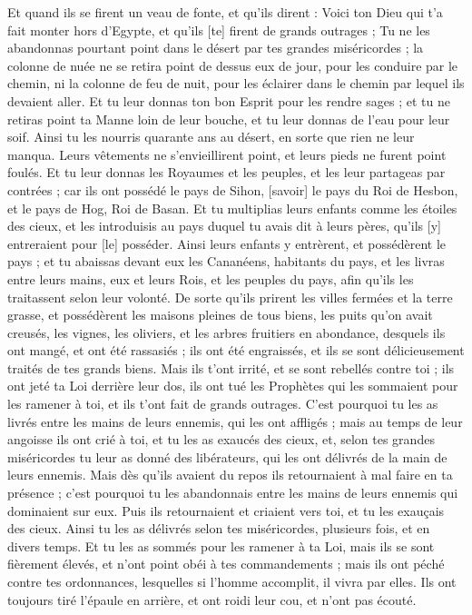 \begin{multicols}{2}
Et quand ils se firent un veau de fonte, et qu'ils dirent : Voici ton Dieu qui t'a fait monter hors d'Egypte, et qu'ils [te] firent de grands outrages ;
Tu ne les abandonnas pourtant point dans le désert par tes grandes miséricordes ; la colonne de nuée ne se retira point de dessus eux de jour, pour les conduire par le chemin, ni la colonne de feu de nuit, pour les éclairer dans le chemin par lequel ils devaient aller.
Et tu leur donnas ton bon Esprit pour les rendre sages ; et tu ne retiras point ta Manne loin de leur bouche, et tu leur donnas de l'eau pour leur soif.
Ainsi tu les nourris quarante ans au désert, en sorte que rien ne leur manqua. Leurs vêtements ne s'envieillirent point, et leurs pieds ne furent point foulés.
Et tu leur donnas les Royaumes et les peuples, et les leur partageas par contrées ; car ils ont possédé le pays de Sihon, [savoir] le pays du Roi de Hesbon, et le pays de Hog, Roi de Basan.
Et tu multiplias leurs enfants comme les étoiles des cieux, et les introduisis au pays duquel tu avais dit à leurs pères, qu'ils [y] entreraient pour [le] posséder.
Ainsi leurs enfants y entrèrent, et possédèrent le pays ; et tu abaissas devant eux les Cananéens, habitants du pays, et les livras entre leurs mains, eux et leurs Rois, et les peuples du pays, afin qu'ils les traitassent selon leur volonté.
De sorte qu'ils prirent les villes fermées et la terre grasse, et possédèrent les maisons pleines de tous biens, les puits qu'on avait creusés, les vignes, les oliviers, et les arbres fruitiers en abondance, desquels ils ont mangé, et ont été rassasiés ; ils ont été engraissés, et ils se sont délicieusement traités de tes grands biens.
Mais ils t'ont irrité, et se sont rebellés contre toi ; ils ont jeté ta Loi derrière leur dos, ils ont tué les Prophètes qui les sommaient pour les ramener à toi, et ils t'ont fait de grands outrages.
C'est pourquoi tu les as livrés entre les mains de leurs ennemis, qui les ont affligés ; mais au temps de leur angoisse ils ont crié à toi, et tu les as exaucés des cieux, et, selon tes grandes miséricordes tu leur as donné des libérateurs, qui les ont délivrés de la main de leurs ennemis.
Mais dès qu'ils avaient du repos ils retournaient à mal faire en ta présence ; c'est pourquoi tu les abandonnais entre les mains de leurs ennemis qui dominaient sur eux. Puis ils retournaient et criaient vers toi, et tu les exauçais des cieux. Ainsi tu les as délivrés selon tes miséricordes, plusieurs fois, et en divers temps.
Et tu les as sommés pour les ramener à ta Loi, mais ils se sont fièrement élevés, et n'ont point obéi à tes commandements ; mais ils ont péché contre tes ordonnances, lesquelles si l'homme accomplit, il vivra par elles. Ils ont toujours tiré l'épaule en arrière, et ont roidi leur cou, et n'ont pas écouté.

\end{multicols}
